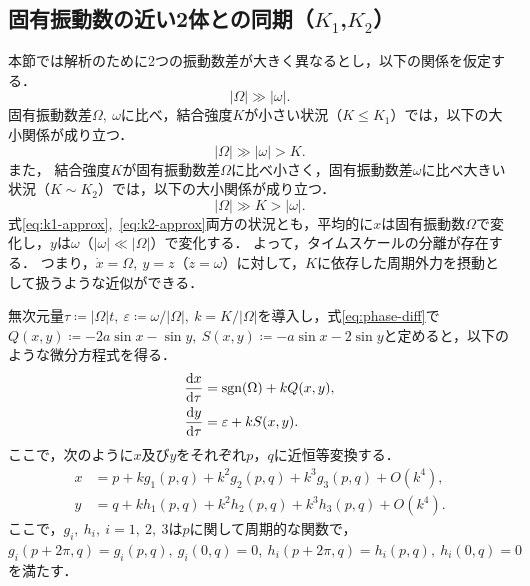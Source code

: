\documentclass[../main]{subfiles}
\begin{document}
    \subsection{固有振動数の近い2体との同期（$K_1$,$K_2$）}
    \label{sec:3body-k12}
    \newcommand{\sgn}{\operatorname{sgn}(\Omega)}
    本節では解析のために2つの振動数差が大きく異なるとし，以下の関係を仮定する．
    \begin{equation}
        \label{eq:assume}
        |\Omega|\gg|\omega|.
    \end{equation}
    固有振動数差$\Omega,\ \omega$に比べ，結合強度$K$が小さい状況（$K\leq K_1$）では，以下の大小関係が成り立つ．
    \begin{equation}
        \label{eq:k1-approx}
        |\Omega|\gg|\omega|>K.
    \end{equation}
    また，
    結合強度$K$が固有振動数差$\Omega$に比べ小さく，固有振動数差$\omega$に比べ大きい状況（$K\sim K_2$）では，以下の大小関係が成り立つ．
    \begin{equation}
        \label{eq:k2-approx}
        |\Omega|\gg K>|\omega|.
    \end{equation}
    式\eqref{eq:k1-approx},\ \eqref{eq:k2-approx}両方の状況とも，平均的に$x$は固有振動数$\Omega$で変化し，$y$は$\omega$（$|\omega|\ll|\Omega|$）で変化する．
    よって，タイムスケールの分離が存在する．
    つまり，$\dot{x}=\Omega,\ y=z$（$\dot{z}=\omega$）に対して，$K$に依存した周期外力を摂動として扱うような近似ができる．

    無次元量$\tau\coloneqq|\Omega| t,\ \varepsilon\coloneqq\omega/|\Omega|,\ k=K/|\Omega|$を導入し，式\eqref{eq:phase-diff}で$Q(x,y)\coloneqq -2a\sin x-\sin y,\ S(x,y)\coloneqq -a\sin x-2\sin y$と定めると，以下のような微分方程式を得る．
    \begin{align}
        \dv{x}{\tau}&=\operatorname{sgn}(\Omega) +k Q(x,y),\\
        \dv{y}{\tau}&=\varepsilon+k S(x,y).
    \end{align}
    ここで，次のように$x$及び$y$をそれぞれ$p$，$q$に近恒等変換する．
    \begin{align}
        x&=p+kg_1(p,q)+k^2g_2(p,q)+k^3g_3(p,q)+O(k^4),\\
        y&=q+kh_1(p,q)+k^2h_2(p,q)+k^3h_3(p,q)+O(k^4).
        \label{eq:pertu-ytilde}
    \end{align}
    ここで，$g_i,\ h_i,\ i=1,\ 2,\ 3$は$p$に関して周期的な関数で，$g_i(p+2\pi,q)=g_i(p,q),\ g_i(0,q)=0,\ h_i(p+2\pi,q)=h_i(p,q),\ h_i(0,q)=0$を満たす．
\end{document}
